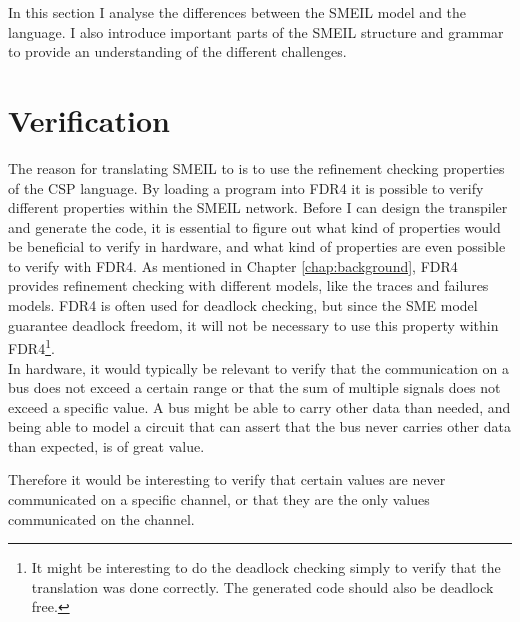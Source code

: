 


In this section I analyse the differences between the SMEIL model and the \cspm{} language. I also introduce important parts of the SMEIL structure and grammar to provide an understanding of the different challenges.

\section{Verification}
\label{sec:analysis_verification}
The reason for translating SMEIL to \cspm{} is to use the refinement checking properties of the CSP language. By loading a \cspm{} program into FDR4 it is possible to verify different properties within the SMEIL network.
Before I can design the transpiler and generate the \cspm{} code, it is essential to figure out what kind of properties would be beneficial to verify in hardware, and what kind of properties are even possible to verify with FDR4.
As mentioned in Chapter \ref{chap:background}, FDR4 provides refinement checking with different models, like the traces and failures models. FDR4 is often used for deadlock checking, but since the SME model guarantee deadlock freedom, it will not be necessary to use this property within FDR4\footnote{It might be interesting to do the deadlock checking simply to verify that the translation was done correctly. The generated \cspm{} code should also be deadlock free.}.\\

In hardware, it would typically be relevant to verify that the communication on a bus does not exceed a certain range or that the sum of multiple signals does not exceed a specific value. A bus might be able to carry other data than needed, and being able to model a circuit that can assert that the bus never carries other data than expected, is of great value.

Therefore it would be interesting to verify that certain values are never communicated on a specific channel, or that they are the only values communicated on the channel.

